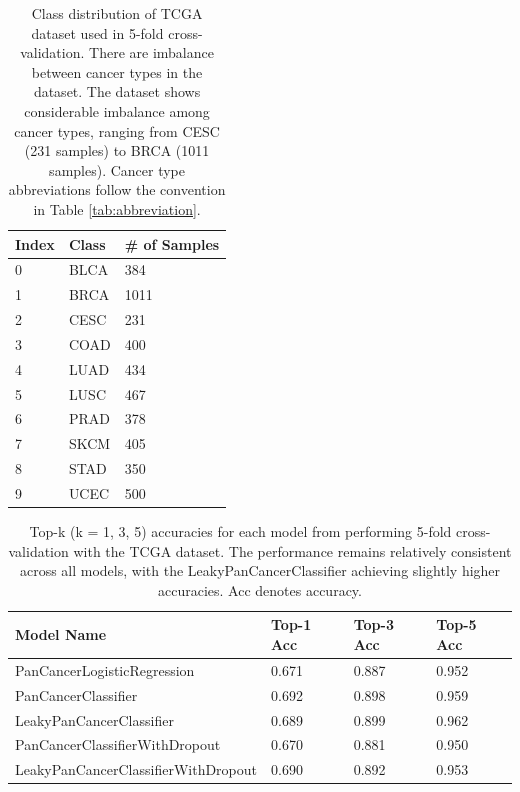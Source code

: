 \documentclass{l4proj}
\begin{document}
\begin{table}[]
\centering
\caption{Class distribution of TCGA dataset used in 5-fold cross-validation. There are imbalance between cancer types in the dataset. The dataset shows considerable imbalance among cancer types, ranging from CESC (231 samples) to BRCA (1011 samples). Cancer type abbreviations follow the convention in Table \ref{tab:abbreviation}.}

\label{tab:datafold}
\begin{tabular}{@{}lll@{}}
\textbf{Index} & \textbf{Class} & \textbf{\# of Samples} \\ \midrule
0     & BLCA  & 384           \\
1     & BRCA  & 1011          \\
2     & CESC  & 231           \\
3     & COAD  & 400           \\
4     & LUAD  & 434           \\
5     & LUSC  & 467           \\
6     & PRAD  & 378           \\
7     & SKCM  & 405           \\
8     & STAD  & 350           \\
9     & UCEC  & 500           \\ 
\end{tabular}
\end{table}

\begin{table}[]
\centering
\caption{Top-k (k = 1, 3, 5) accuracies for each model from performing 5-fold cross-validation with the TCGA dataset. The performance remains relatively consistent across all models, with the LeakyPanCancerClassifier achieving slightly higher accuracies. Acc denotes accuracy.}
\label{tab:5foldacc}
\begin{tabular}{@{}llll@{}}
\textbf{Model Name}                 & \textbf{Top-1 Acc} & \textbf{Top-3 Acc} & \textbf{Top-5 Acc} \\ \midrule
PanCancerLogisticRegression         & 0.671       & 0.887       & 0.952       \\
PanCancerClassifier                 & 0.692       & 0.898       & 0.959       \\
LeakyPanCancerClassifier            & 0.689       & 0.899       & 0.962       \\
PanCancerClassifierWithDropout      & 0.670       & 0.881       & 0.950       \\
LeakyPanCancerClassifierWithDropout & 0.690       & 0.892       & 0.953      
\end{tabular}
\end{table}
\end{document}
